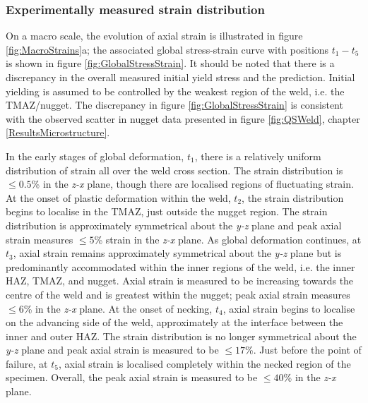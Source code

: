 

\subsubsection{Experimentally measured strain distribution}
\label{SMDModellingstudyResultsExp}
On a macro scale, the evolution of axial strain is illustrated in figure \ref{fig:MacroStrains}a; the associated global stress-strain curve with positions $t_1 - t_5$ is shown in figure \ref{fig:GlobalStressStrain}. It should be noted that there is a discrepancy in the overall measured initial yield stress and the prediction. Initial yielding is assumed to be controlled by the weakest region of the weld, i.e. the TMAZ/nugget. The discrepancy in figure \ref{fig:GlobalStressStrain} is consistent with the observed scatter in nugget data presented in figure \ref{fig:QSWeld}, chapter \ref{ResultsMicrostructure}. 

In the early stages of global deformation, $t_1$, there is a relatively uniform distribution of strain all over the weld cross section. The strain distribution is $\leq 0.5$\% in the \textit{z-x} plane, though there are localised regions of fluctuating strain. At the onset of plastic deformation within the weld, $t_2$, the strain distribution begins to localise in the TMAZ, just outside the nugget region. The strain distribution is approximately symmetrical about the \textit{y-z} plane and peak axial strain measures $\leq 5$\% strain in the \textit{z-x} plane. As global deformation continues, at $t_3$, axial strain remains approximately symmetrical about the \textit{y-z} plane but is predominantly accommodated within the inner regions of the weld, i.e. the inner HAZ, TMAZ, and nugget. Axial strain is measured to be increasing towards the centre of the weld and is greatest within the nugget; peak axial strain measures $\leq 6$\% in the \textit{z-x} plane. At the onset of necking, $t_4$, axial strain begins to localise on the advancing side of the weld, approximately at the interface between the inner and outer HAZ. The strain distribution is no longer symmetrical about the \textit{y-z} plane and peak axial strain is measured to be $\leq 17$\%. Just before the point of failure, at $t_5$, axial strain is localised completely within the necked region of the specimen. Overall, the peak axial strain is measured to be $\leq 40$\% in the \textit{z-x} plane. 

